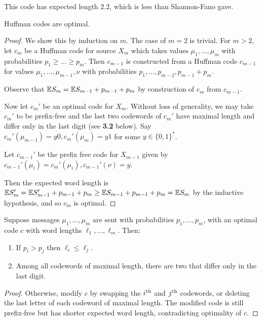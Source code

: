 \documentclass[10pt,a4paper]{article}
\begin{document}
This code has expected length $2.2$, which is less than Shannon-Fano gave.
\begin{theorem}[Huffman, 1952]
Huffman codes are optimal.
\end{theorem}
\begin{proof}
We show this by induction on $m$. The case of $m=2$ is trivial. For $m > 2$, let $c_m$ be a Huffman code for source $X_m$ which takes values $\mu_1, \ldots, \mu_m$ with probabilities $p_1 \geq \ldots \geq p_m$. Then $c_{m-1}$ is constructed from a Huffman code $c_{m-1}$ for values $\mu_1, \ldots, \mu_{m-1}, \nu$ with probabilities $p_1, \ldots, p_{m-2}, p_{m-1}+p_m$.

Observe that $\mathbb{E} S_m = \mathbb{E} S_{m-1} + p_{m-1} + p_m$ by construction of $c_m$ from $c_{m-1}$.

Now let $c_m'$ be an optimal code for $X_m$. Without loss of generality, we may take $c_m'$ to be prefix-free and the last two codewords of $c_m'$ have maximal length and differ only in the last digit (see \textbf{3.2} below). Say $c_m'(\mu_{m-1}) = y0, c_m'(\mu_m) = y1$ for some $y \in \{0, 1\}^\ast$.

Let $c_{m-1}'$ be the prefix free code for $X_{m-1}$ given by $c_{m-1}'(\mu_i) = c_m'(\mu_i), c_{m-1}'(\nu) = y$.

Then the expected word length is $\mathbb{E} S_m' = \mathbb{E} S_{m-1}' + p_{m-1} + p_m \geq \mathbb{E} S_{m-1} + p_{m-1} + p_m = \mathbb{E} S_m$ by the inductive hypothesis, and so $c_m$ is optimal.
\end{proof}
\begin{lemma}
Suppose messages $\mu_1, \ldots, \mu_m$ are sent with probabilities $p_1,\ldots, p_m$, with an optimal code $c$ with word lengths $\ell_1, \ldots, \ell_m$. Then:
\begin{enumerate}
\item If $p_i > p_j$ then $\ell_i \leq \ell_j$.
\item Among all codewords of maximal length, there are two that differ only in the last digit.
\end{enumerate}
\end{lemma}
\begin{proof}
Otherwise, modify $c$ by swapping the $i\textsuperscript{th}$ and $j\textsuperscript{th}$ codewords, or deleting the last letter of each codeword of maximal length. The modified code is still prefix-free but has shorter expected word length, contradicting optimality of $c$.
\end{proof}
\end{document}
